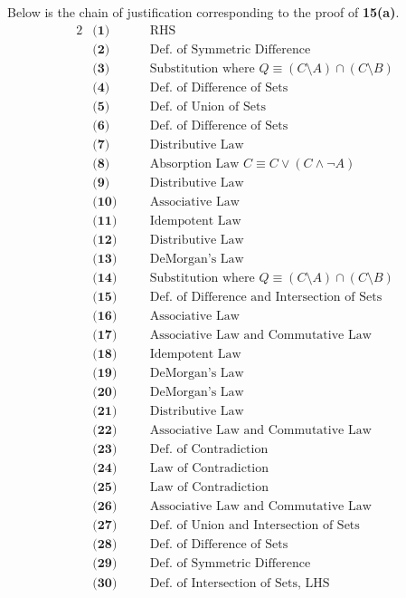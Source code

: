 Below is the chain of justification corresponding to the proof of \textbf{15(a)}.
\begin{alignat*}{2}
&\textbf{(1)} && \quad \text{RHS} \\
&\textbf{(2)} && \quad \text{Def. of Symmetric Difference} \\
&\textbf{(3)} && \quad \text{Substitution where $Q \equiv (C \setminus A) \cap (C \setminus B)$} \\
&\textbf{(4)} && \quad \text{Def. of Difference of Sets} \\
&\textbf{(5)} && \quad \text{Def. of Union of Sets} \\
&\textbf{(6)} && \quad \text{Def. of Difference of Sets} \\
&\textbf{(7)} && \quad \text{Distributive Law} \\
&\textbf{(8)} && \quad \text{Absorption Law $C \equiv C \vee (C \wedge \neg A)$} \\
&\textbf{(9)} && \quad \text{Distributive Law} \\
&\textbf{(10)} && \quad \text{Associative Law} \\
&\textbf{(11)} && \quad \text{Idempotent Law} \\
&\textbf{(12)} && \quad \text{Distributive Law} \\
&\textbf{(13)} && \quad \text{DeMorgan's Law} \\
&\textbf{(14)} && \quad \text{Substitution where $Q \equiv (C \setminus A) \cap (C \setminus B)$} \\
&\textbf{(15)} && \quad \text{Def. of Difference and Intersection of Sets} \\
&\textbf{(16)} && \quad \text{Associative Law} \\
&\textbf{(17)} && \quad \text{Associative Law and Commutative Law} \\
&\textbf{(18)} && \quad \text{Idempotent Law} \\
&\textbf{(19)} && \quad \text{DeMorgan's Law} \\
&\textbf{(20)} && \quad \text{DeMorgan's Law} \\
&\textbf{(21)} && \quad \text{Distributive Law} \\
&\textbf{(22)} && \quad \text{Associative Law and Commutative Law} \\
&\textbf{(23)} && \quad \text{Def. of Contradiction} \\
&\textbf{(24)} && \quad \text{Law of Contradiction} \\
&\textbf{(25)} && \quad \text{Law of Contradiction} \\
&\textbf{(26)} && \quad \text{Associative Law and Commutative Law} \\
&\textbf{(27)} && \quad \text{Def. of Union and Intersection of Sets} \\
&\textbf{(28)} && \quad \text{Def. of Difference of Sets} \\
&\textbf{(29)} && \quad \text{Def. of Symmetric Difference} \\
&\textbf{(30)} && \quad \text{Def. of Intersection of Sets, LHS} \\
\end{alignat*}
\pagebreak


